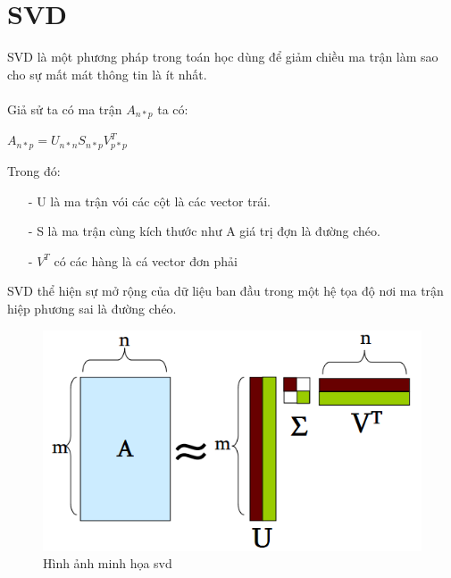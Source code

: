 \documentclass[a4paper,10pt]{report}
\begin{document}
\section{SVD}
SVD là một phương pháp trong toán học dùng để giảm chiều ma trận làm sao cho sự mất mát thông tin là ít nhất. \\  \\
Giả sử ta có ma trận $A_{n*p}$ ta có:
\begin{center}
\huge{
$A_{n*p} = U_{n*n}S_{n*p}V^{T}_{p*p}$
}
\end{center}
Trong đó:
\begin{itemize}
\item[-] U là ma trận vói các cột là các vector trái.
\item[-] S là ma trận cùng kích thước như A giá trị đợn là đường chéo.
\item[-] $V^T$ có các hàng là cá vector đơn phải 
\end{itemize}
SVD thể hiện sự mở rộng của dữ liệu ban đầu trong một hệ tọa độ nơi ma trận hiệp phương sai là đường chéo.
\begin{figure}[h]
\begin{center}
\includegraphics[scale=0.8]{svd.png}
\end{center}
\caption{Hình ảnh minh họa svd}
\end{figure}
\end{document}

